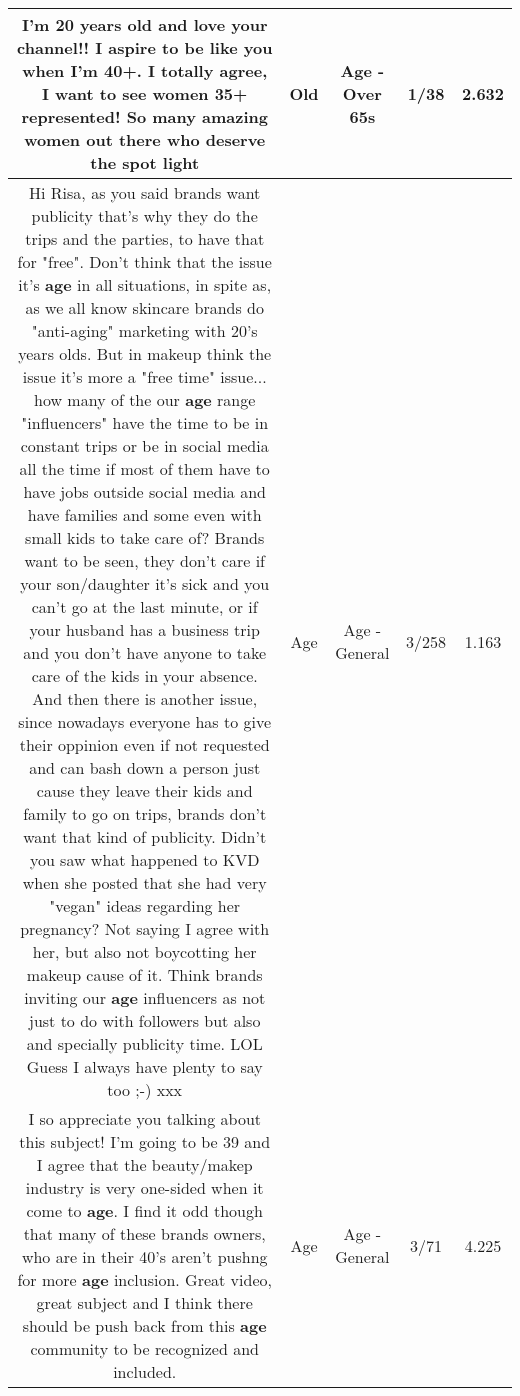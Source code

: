 \documentclass[11pt]{article}
\newlength\mylength
\begin{document}
\begin{center}
\begin{longtable}{|C{.65\mylength}|C{.30\mylength}|C{.12\mylength}|C{.12\mylength}|C{.12\mylength}|}
  \small I'm 20 years \textbf{old} and love your channel!! I aspire to be like you when I'm 40+. I totally agree, I want to see women 35+ represented! So many amazing women out there who deserve the spot light\normalsize   & Old & Age - Over 65s & 1/38 & 2.632 \\  \hline
  \small Hi Risa, as you said brands want publicity that's why they do the trips and the parties, to have that for "free". Don't think that the issue it's \textbf{age} in all situations, in spite as, as we all know skincare brands do "anti-aging" marketing with 20's years olds. But in makeup think the issue it's more a "free time" issue... how many of the our \textbf{age} range "influencers" have the time to be in constant trips or be in social media all the time if most of them have to have jobs outside social media and have families and some even with small kids to take care of? Brands want to be seen, they don't care if your son/daughter it's sick and you can't go at the last minute, or if your husband has a business trip and you don't have anyone to take care of the kids in your absence. And then there is another issue, since nowadays everyone has to give their oppinion even if not requested and can bash down a person just cause they leave their kids and family to go on trips, brands don't want that kind of publicity. Didn't you saw what happened to KVD when she posted that she had very "vegan" ideas regarding her pregnancy? Not saying I agree with her, but also not boycotting her makeup cause of it. Think brands inviting our \textbf{age} influencers as not just to do with followers but also and specially publicity time. LOL Guess I always have plenty to say too ;-) xxx\normalsize   & Age & Age - General & 3/258 & 1.163 \\  \hline
  \small I so appreciate you talking about this subject! I'm going to be 39 and I agree that the beauty/makep industry is very one-sided when it come to \textbf{age}. I find it odd though that many of these brands owners, who are in their 40's aren't pushng for more \textbf{age} inclusion. Great video, great subject and I think there should be push back from this \textbf{age} community to be recognized and included.\normalsize   & Age & Age - General & 3/71 & 4.225 \\  \hline

\end{longtable}
\end{center}
\end{document}
